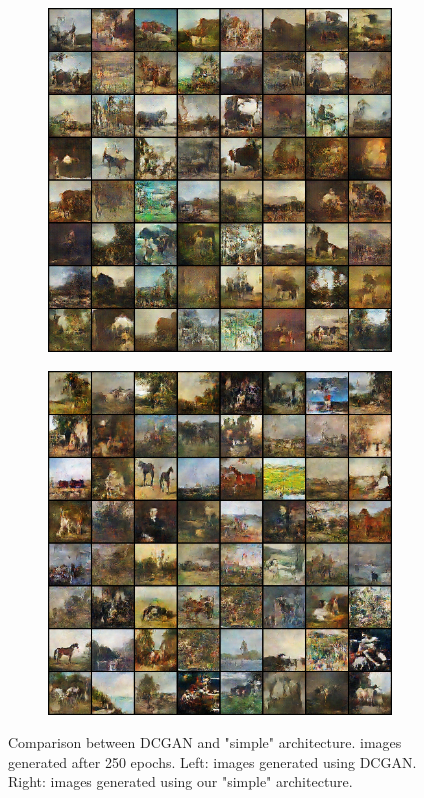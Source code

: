 \documentclass[a4paper]{article}
\begin{document}
\begin{figure}[ht]
    \centering
    \begin{subfigure}[b]{0.45\textwidth}
        \includegraphics[width=\textwidth]{vanillaGAN.jpg}
    \end{subfigure}
    \hspace{0.5cm}
    \begin{subfigure}[b]{0.45\textwidth}
        \includegraphics[width=\textwidth]{simpleGAN.jpg}
    \end{subfigure}
    \caption{Comparison between DCGAN and "simple" architecture. images generated after 250 epochs. Left: images generated using DCGAN. Right: images generated using our "simple" architecture.}\label{fig:DCGAN}
\end{figure}
\end{document}
